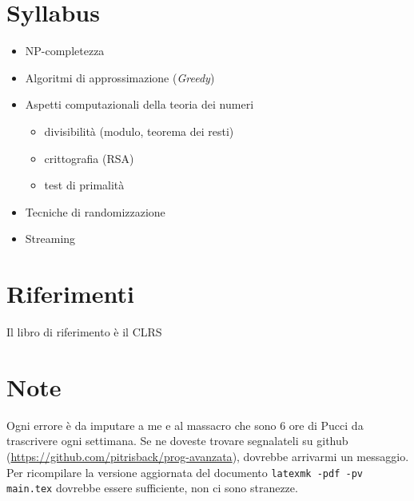 

\section{Syllabus}

\begin{itemize}
    \item NP-completezza
    \item Algoritmi di approssimazione (\textit{Greedy})
    \item Aspetti computazionali della teoria dei numeri
        \begin{itemize}
            \item divisibilità (modulo, teorema dei resti)
            \item crittografia (RSA)
            \item test di primalità
        \end{itemize}
    \item Tecniche di randomizzazione
    \item Streaming
\end{itemize}

\section{Riferimenti}

Il libro di riferimento è il CLRS \cite{Cormen:2009:IAT:1614191}

\section{Note}

Ogni errore è da imputare a me e al massacro che sono 6 ore di Pucci da trascrivere ogni settimana. Se ne doveste trovare segnalateli su github (\url{https://github.com/pitrisback/prog-avanzata}), dovrebbe arrivarmi un messaggio. Per ricompilare la versione aggiornata del documento \texttt{latexmk -pdf -pv main.tex} dovrebbe essere sufficiente, non ci sono stranezze.
